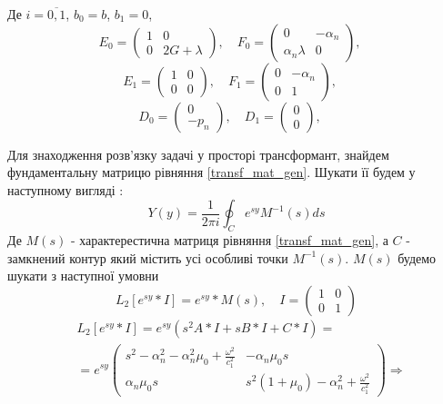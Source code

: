 Де $i = \overline{0, 1}$, $b_0 = b$, $b_1 = 0$,
\begin{equation*}
    E_0 = \begin{pmatrix}
        1 & 0 \\
        0 & 2G + \lambda
    \end{pmatrix}, \quad
    F_0 = \begin{pmatrix}
        0 & -\alpha_n \\
        \alpha_n \lambda & 0
    \end{pmatrix}, \quad
\end{equation*}
\begin{equation*}
    E_1 = \begin{pmatrix}
        1 & 0 \\
        0 & 0
    \end{pmatrix}, \quad
    F_1 = \begin{pmatrix}
        0 & -\alpha_n \\
        0 & 1
    \end{pmatrix}, \quad
\end{equation*}
\begin{equation*}
    D_0 = \begin{pmatrix}
        0 \\
        -p_n
    \end{pmatrix}, \quad
    D_1 = \begin{pmatrix}
        0 \\
        0
    \end{pmatrix}, \quad
\end{equation*}

Для знаходження розв'язку задачі у просторі трансформант, знайдем фундаментальну матрицю рівняння \eqref{transf_mat_gen}.
Шукати її будем у наступному вигляді \cite{gantmaher}:
\begin{equation}
    Y(y) = \frac{1}{2\pi i} \oint_C e^{sy} M^{-1}(s)ds
\end{equation}
Де $M(s)$ - характерестична матриця рівняння \eqref{transf_mat_gen}, а $C$ - замкнений контур який містить усі особливі точки $M^{-1}(s)$. $M(s)$ будемо шукати з наступної умовни
\begin{equation}
    L_2\left[ e^{sy}*I \right] = e^{sy} * M(s), \quad I = \begin{pmatrix} 1 & 0 \\ 0 & 1 \end{pmatrix}
\end{equation}
\begin{align*}
    &L_2\left[ e^{sy}*I \right] = e^{sy} \left( s^2A * I + s B*I + C*I \right) = \\
    &=e^{sy} \begin{pmatrix}
        s^2 - \alpha_n^2 - \alpha_n^2\mu_0 + \frac{\omega^2}{c_1^2} & -\alpha_n \mu_0 s \\
        \alpha_n \mu_0 s & s^2 (1 + \mu_0) -\alpha_n^2 + \frac{\omega^2}{c_1^2}
     \end{pmatrix} \Rightarrow
\end{align*}

